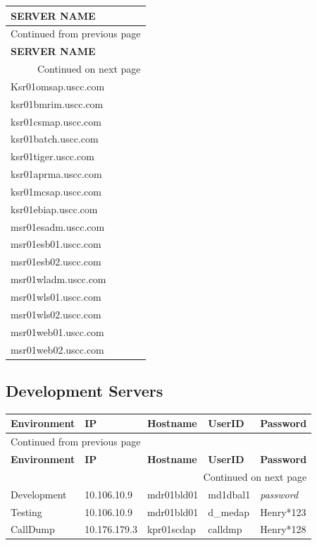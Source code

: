 \documentclass[12pt,twoside]{article}
\begin{document}
\begin{longtable}{l}
\hline
\textbf{SERVER NAME}\\
\hline
\endfirsthead
\multicolumn{1}{l}{Continued from previous page} \\
\hline

\textbf{SERVER NAME} \\

\hline
\endhead
\hline\multicolumn{1}{r}{Continued on next page} \\
\endfoot
\endlastfoot
\hline
Ksr01omsap.uscc.com\\
ksr01bmrim.uscc.com\\
ksr01csmap.uscc.com\\
ksr01batch.uscc.com\\
ksr01tiger.uscc.com\\
ksr01aprma.uscc.com\\
ksr01mcsap.uscc.com\\
ksr01ebiap.uscc.com\\
msr01esadm.uscc.com\\
msr01esb01.uscc.com\\
msr01esb02.uscc.com\\
msr01wladm.uscc.com\\
msr01wls01.uscc.com\\
msr01wls02.uscc.com\\
msr01web01.uscc.com\\
msr01web02.uscc.com\\
\hline
\end{longtable}

\normalsize
\subsection{Development Servers}
\label{sec:orgheadline14}
\footnotesize

\begin{longtable}{lllll}
\hline
\textbf{Environment} & \textbf{IP} & \textbf{Hostname} & \textbf{UserID} & \textbf{Password}\\
\hline
\endfirsthead
\multicolumn{5}{l}{Continued from previous page} \\
\hline

\textbf{Environment} & \textbf{IP} & \textbf{Hostname} & \textbf{UserID} & \textbf{Password} \\

\hline
\endhead
\hline\multicolumn{5}{r}{Continued on next page} \\
\endfoot
\endlastfoot
\hline
Development & 10.106.10.9 & mdr01bld01 & md1dbal1 & \emph{password}\\
Testing & 10.106.10.9 & mdr01bld01 & d\_medap & Henry*123\\
CallDump & 10.176.179.3 & kpr01scdap & calldmp & Henry*128\\
\hline
\end{longtable}
\end{document}
